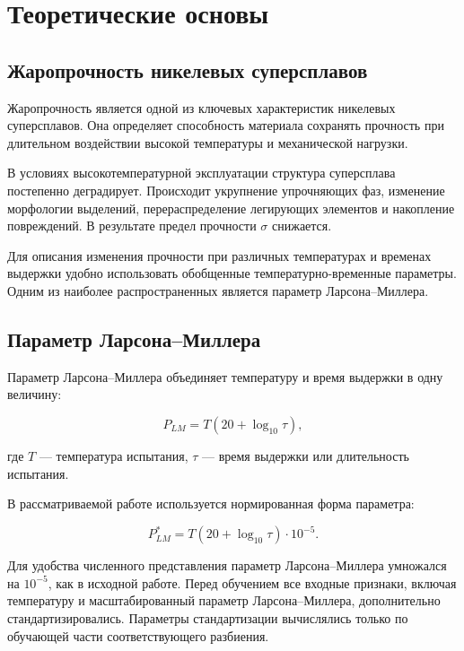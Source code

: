 \section{Теоретические основы}

\subsection{Жаропрочность никелевых суперсплавов}

Жаропрочность является одной из ключевых характеристик никелевых 
суперсплавов. Она определяет способность материала сохранять прочность 
при длительном воздействии высокой температуры и механической нагрузки.

В условиях высокотемпературной эксплуатации структура суперсплава 
постепенно деградирует. Происходит укрупнение упрочняющих фаз, 
изменение морфологии выделений, перераспределение легирующих элементов и 
накопление повреждений. В результате предел прочности $\sigma$ снижается.

Для описания изменения прочности при различных температурах и временах 
выдержки удобно использовать обобщенные температурно-временные параметры. 
Одним из наиболее распространенных является параметр Ларсона--Миллера.

\subsection{Параметр Ларсона--Миллера}

Параметр Ларсона--Миллера объединяет температуру и время выдержки в 
одну величину:

\begin{equation}
P_{LM} =
T
\left(
20 + \log_{10}\tau
\right),
\end{equation}

где $T$ --- температура испытания, $\tau$ --- время выдержки или 
длительность испытания.

В рассматриваемой работе используется нормированная форма параметра:

\begin{equation}
P_{LM}^{*} =
T
\left(
20 + \log_{10}\tau
\right)
\cdot 10^{-5}.
\end{equation}

Для удобства численного представления параметр
Ларсона--Миллера умножался на $10^{-5}$,
как в исходной работе.
Перед обучением все входные признаки,
включая температуру и масштабированный параметр
Ларсона--Миллера, дополнительно стандартизировались.
Параметры стандартизации вычислялись только
по обучающей части соответствующего разбиения.

